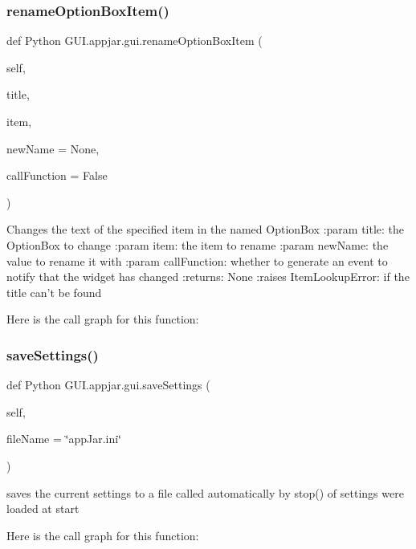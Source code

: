 \begin{DoxyVerb}
\subsubsection{\texorpdfstring{rename\+Option\+Box\+Item()}{renameOptionBoxItem()}}
{\footnotesize\ttfamily def Python G\+U\+I.\+appjar.\+gui.\+rename\+Option\+Box\+Item (\begin{DoxyParamCaption}\item[{}]{self,  }\item[{}]{title,  }\item[{}]{item,  }\item[{}]{new\+Name = {\ttfamily None},  }\item[{}]{call\+Function = {\ttfamily False} }\end{DoxyParamCaption})}

\begin{DoxyVerb}Changes the text of the specified item in the named OptionBox
:param title: the OptionBox to change
:param item: the item to rename
:param newName: the value to rename it with
:param callFunction: whether to generate an event to notify that the widget has changed
:returns: None
:raises ItemLookupError: if the title can't be found
\end{DoxyVerb}
 Here is the call graph for this function\+:
\mbox{\label{class_python_01_g_u_i_1_1appjar_1_1gui_a137411361931260f10d73b09d061d47d}} 
\subsubsection{\texorpdfstring{save\+Settings()}{saveSettings()}}
{\footnotesize\ttfamily def Python G\+U\+I.\+appjar.\+gui.\+save\+Settings (\begin{DoxyParamCaption}\item[{}]{self,  }\item[{}]{file\+Name = {\ttfamily \char`\"{}appJar.ini\char`\"{}} }\end{DoxyParamCaption})}

\begin{DoxyVerb}saves the current settings to a file
    called automatically by stop() of settings were loaded at start \end{DoxyVerb}
 Here is the call graph for this function\+:
\mbox{\label{class_python_01_g_u_i_1_1appjar_1_1gui_af487197cf6060c841c8fcfebeb77e314}} 

\end{DoxyVerb}
